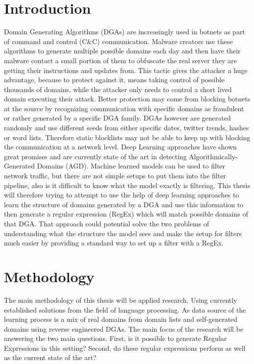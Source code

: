 \documentclass[a4paper, 12pt]{article}
\begin{document}
\section{Introduction}
Domain Generating Algorithms (DGAs) are increasingly used in botnets as part of
command and control (C\&C) communication. Malware creators use these algorithms
to generate multiple possible domains each day and then have their malware
contact a small portion of them to obfuscate the real server they are getting
their instructions and updates from. This tactic gives the attacker a huge
advantage, because to protect against it, means taking control of possible thousands
of domains, while the attacker only needs to control a short lived domain
executing their attack. Better protection may come from blocking
botnets at the source by recognizing communication with specific domains as
fraudulent or rather generated by a specific DGA family. DGAs however are
generated randomly and use different seeds from either specific dates, twitter
trends, hashes or word lists. Therefore static blocklists may not be able to
keep up with blocking the communication at a network level. Deep Learning
approaches have shown great promises and are currently state of the art in
detecting Algorithmically-Generated Domains (AGD). 
Machine learned models can be used to filter network traffic, but there are not simple setups to put
them into the filter pipeline, also is it difficult to know what the model exactly is filtering.
This thesis will therefore trying to attempt to use the help of deep learning approaches  to learn the structure
of domains generated by a DGA and use this information to then generate a regular expression (RegEx) 
which will match possible domains of that DGA. That approach could potential solve the two problems
of understanding what the structure the model sees and make the setup for filters much easier by
providing a standard way to set up a filter with a RegEx.


\section{Methodology}
The main methodology of this thesis will be applied research. Using currently established solutions
from the field of language processing. As data source of the learning process is a mix of real domains
from domain lists and self-generated domains using reverse engineered DGAs. \cite{bader_baderjdomain_generation_algorithms_2024}
The main focus of the research will be answering the two main questions. First, is it possible to
generate Regular Expressions in this setting? Second, do these regular expressions perform as well
as the current state of the art?
\end{document}
